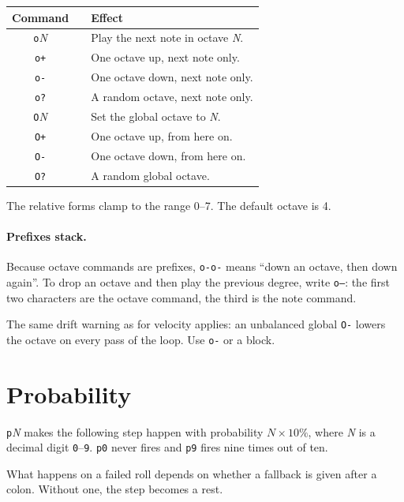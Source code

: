 \documentclass[11pt,a4paper]{article}
\newcommand{\pat}[1]{\texttt{#1}}
\newcommand{\meta}[1]{\textit{#1}}
\begin{document}
\begin{center}
\begin{tabular}{@{}clp{85mm}@{}}
\toprule
\textbf{Command} & & \textbf{Effect}\\
\midrule
\pat{o}\meta{N} & & Play the next note in octave \meta{N}.\\
\pat{o+}        & & One octave up, next note only.\\
\pat{o-}        & & One octave down, next note only.\\
\pat{o?}        & & A random octave, next note only.\\
\midrule
\pat{O}\meta{N} & & Set the global octave to \meta{N}.\\
\pat{O+}        & & One octave up, from here on.\\
\pat{O-}        & & One octave down, from here on.\\
\pat{O?}        & & A random global octave.\\
\bottomrule
\end{tabular}
\end{center}

The relative forms clamp to the range 0--7. The default octave is 4.

\paragraph{Prefixes stack.} Because octave commands are prefixes, \pat{o-o-}
means ``down an octave, then down again''. To drop an octave and then play the
previous degree, write \pat{o--}: the first two characters are the octave
command, the third is the note command.

The same drift warning as for velocity applies: an unbalanced global \pat{O-}
lowers the octave on every pass of the loop. Use \pat{o-} or a block.

\section{Probability}

\pat{p}\meta{N} makes the following step happen with probability
$\meta{N} \times 10\%$, where \meta{N} is a decimal digit \pat{0}--\pat{9}.
\pat{p0} never fires and \pat{p9} fires nine times out of ten.

What happens on a failed roll depends on whether a fallback is given after a
colon. Without one, the step becomes a rest.
\end{document}
